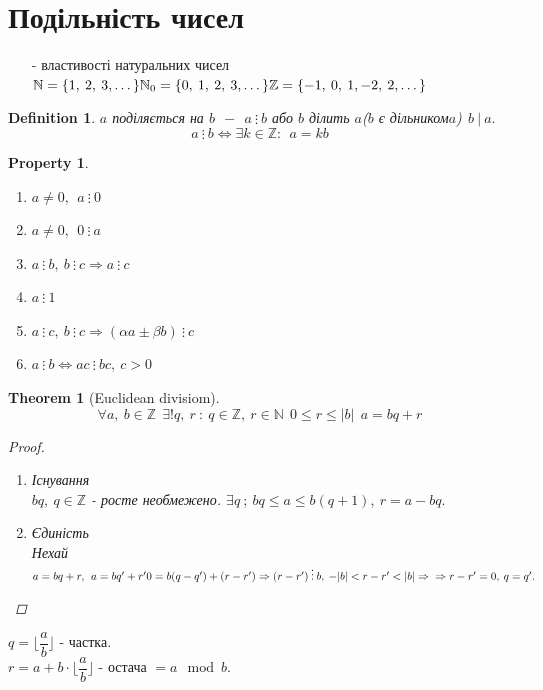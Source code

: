 \documentclass[a4paper,12pt, centered]{bookest}
\newtheorem{theorem}{Theorem}[section]
\newtheorem{definition}{Definition}[section]
\newtheorem*{property*}{Property}
\begin{document}
\section{Подільність чисел}
	\begin{enumerate}
		\item[-]властивості натуральних чисел\\
		$\mathbb{N}=\{1,\>2,\>3,\dots\}\\
		\mathbb{N}_0=\{0,\>1,\>2,\>3,\dots\}\\
		\mathbb{Z}=\{-1,\>0,\>1,-2,\>2,\dots\}$
	\end{enumerate}
	\begin{definition}
		$a$ поділяється на $b\>\>-\>\>a\>\vdots\>b$ або  $b$ ділить $a$($b$ є дільником$a$)$\>\>b\>|\>a.$
		$$a\>\vdots\>b\Leftrightarrow\exists k\in\mathbb{Z}:\>\>a=kb$$
	\end{definition}
	\begin{property*}$ $
	\begin{enumerate}
		\item $a\neq 0,\>\>a\>\vdots\>0$
		\item $a\neq 0,\>\>0\>\vdots\>a$
		\item $a\>\vdots\>b,\>b\>\vdots\>c\Rightarrow a\>\vdots\>c$
		\item $a\>\vdots\>1$
		\item $a\>\vdots\>c,\>b\>\vdots\>c\Rightarrow (\alpha a\pm\beta b)\>\vdots\>c$
		\item $a\>\vdots\>b\Leftrightarrow ac\>\vdots\>bc,\>c>0$
	\end{enumerate}		
	\end{property*}
	\begin{theorem}[Euclidean divisiom] 
	$$\forall a,\>b\in\mathbb{Z}\>\>\exists!q,\>r\>:\>q\in\mathbb{Z},\>r\in\mathbb{N}\>\>0\leq r\leq |b|\>\>a=bq+r$$
	\newpage
	\begin{proof}$ $
		\begin{enumerate}
			\item Існування\\
			$bq,\>q\in\mathbb{Z}$ - росте необмежено. $\exists q\>;\>bq\leq a\leq b(q+1),\>r=a-bq.$
			\item Єдиність\\
			Нехай $a=bq+r,\>\>a=bq'+r'\\
			0=b(q-q')+(r-r')\Rightarrow(r-r')\>\vdots\>b,\>-|b|<r-r'<|b|\Rightarrow\\\Rightarrow r-r'=0,\>q=q'.$
		\end{enumerate}
	\end{proof}
	\end{theorem}
	$q=\lfloor\dfrac{a}{b}\rfloor$ - частка.\\
	$r=a+b\cdot\lfloor\dfrac{a}{b}\rfloor$ - остача $=a\mod b$.
\end{document}
